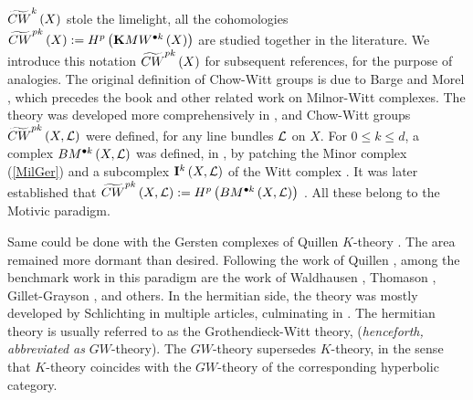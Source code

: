 \documentclass[12pt]{article}
\begin{document}
 $\widetilde{CW}^k\left( X\right)$ stole the limelight, all the cohomologies $\widetilde{CW}^{pk}\left( X\right):= H^p\left( {\bf K}MW^{{\bullet}k}\left( X\right)\right)$ are studied together in the literature. We introduce this notation $\widetilde{CW}^{pk}\left( X\right)$ for subsequent  references, for the purpose of analogies. The original definition of Chow-Witt groups is due to Barge and Morel
 \cite{BM0}, which precedes  the book  \cite{M12} and other related work on Milnor-Witt complexes. The theory was  developed more comprehensively in \cite{F8}, and Chow-Witt groups $\widetilde{CW}^{pk}\left( X, {\mathcal{L}}\right)$ were defined, for any line bundles ${\mathcal{L}}$ on $X$. For $0\leq k\leq d$, a complex $BM^{{\bullet}k}\left( X, {\mathcal{L}}\right)$ was defined, in \cite{BM0, F8}, by patching the Minor complex (\ref{MilGer}) and a subcomplex ${\bf I}^k\left( X, {\mathcal{L}}\right)$ of the Witt complex \cite{BW2}. It was later  established that $\widetilde{CW}^{pk}\left( X, {\mathcal{L}}\right):=H^p\left( BM^{{\bullet}k}\left( X, {\mathcal{L}}\right)\right)$ \cite[pp 147]{M12}. All these belong to the Motivic paradigm. 
 

 Same  could be done with the Gersten complexes of Quillen $K$-theory \cite[pp 252]{M23}. The   area remained more dormant than desired. Following the work of Quillen \cite{Q73, G76}, among the benchmark work 
 in this paradigm are the work of Waldhausen \cite{W83}, Thomason \cite{TT90}, Gillet-Grayson \cite{GG87}, and others. In the hermitian side, the theory was mostly developed by Schlichting in multiple articles, culminating  in \cite{S17}. The hermitian theory is usually referred to as the Grothendieck-Witt theory, ({\it  henceforth, abbreviated as} $GW$-theory). The $GW$-theory supersedes $K$-theory, 
 in the sense that $K$-theory coincides with the $GW$-theory of the corresponding hyperbolic category. 
 
\end{document}
